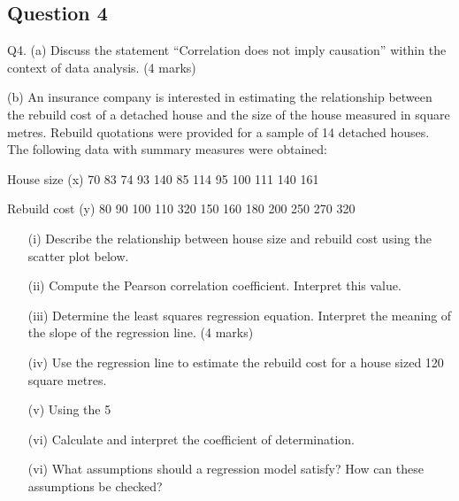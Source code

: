 \newpage
\subsection*{Question 4}


Q4. (a) Discuss the statement “Correlation does not imply causation” within the context of data analysis. (4 marks)



\newpage
(b) An insurance company is interested in estimating the relationship between the rebuild cost of a detached house and the size of the house measured in square metres. Rebuild quotations were provided for a sample of 14 detached houses. The following data with summary measures were obtained:

House size (x) 70 83 74 93 140 85 114 95 100 111 140 161

Rebuild cost (y) 80 90 100 110 320 150 160 180 200 250 270 320

\begin{itemize}

\item[(i)] Describe the relationship between house size and rebuild cost using the scatter plot below. %

\item[(ii)] Compute the Pearson correlation coefficient. Interpret this value.  %

\item[(iii)] Determine the least squares regression equation. Interpret the meaning of the slope of the regression line. (4 marks)

\item[(iv)] Use the regression line to estimate the rebuild cost for a house sized 120 square metres. %

\item[(v)] Using the 5%

\item[(vi)] Calculate and interpret the coefficient of determination.  %

\item[(vi)] What assumptions should a regression model satisfy? How can these assumptions be checked?  %

\end{itemize}


